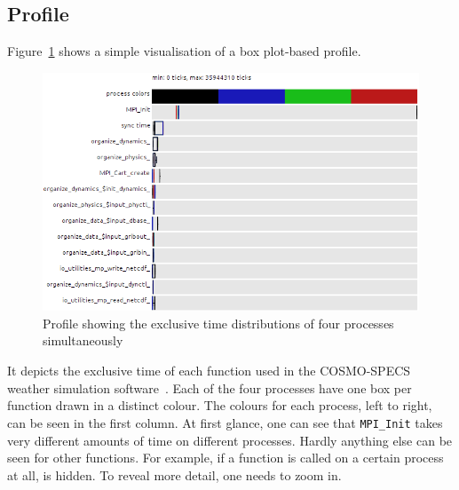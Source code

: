 \documentclass[b5paper, final, hauptseminar]{zih-template}
\begin{document}
\subsection{Profile}
Figure~\ref{fig:id-p-4-1} shows a simple visualisation of a box plot-based profile.
\begin{figure}[htbp]
	\centering
	\includegraphics[width=0.8\linewidth]{id-p-4-1}
	\caption{Profile showing the exclusive time distributions of four processes simultaneously}
	\label{fig:id-p-4-1}
\end{figure}
It depicts the exclusive time of each function used in the COSMO-SPECS weather simulation software~\cite{gruetzun08}.
Each of the four processes have one box per function drawn in a distinct colour.
The colours for each process, left to right, can be seen in the first column.
At first glance, one can see that \texttt{MPI\_Init} takes very different amounts of time on different processes.
Hardly anything else can be seen for other functions. For example, if a function is called on a certain process at all, is hidden.
To reveal more detail, one needs to zoom in.
\end{document}
